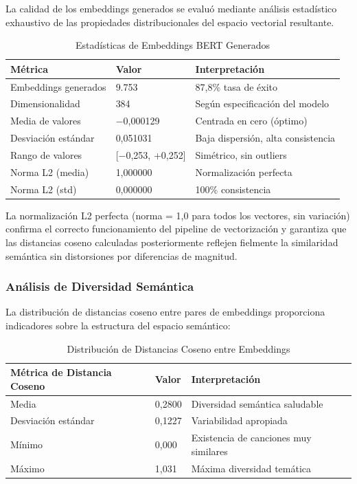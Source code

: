 La calidad de los embeddings generados se evaluó mediante análisis estadístico exhaustivo de las propiedades distribucionales del espacio vectorial resultante.

\begin{table}[htbp]
\centering
\caption{Estadísticas de Embeddings BERT Generados}
\label{tab:estadisticas-embeddings}
\begin{tabular}{lll}
\toprule
\textbf{Métrica} & \textbf{Valor} & \textbf{Interpretación} \\
\midrule
Embeddings generados & 9.753 & 87,8\% tasa de éxito \\
Dimensionalidad & 384 & Según especificación del modelo \\
Media de valores & $-$0,000129 & Centrada en cero (óptimo) \\
Desviación estándar & 0,051031 & Baja dispersión, alta consistencia \\
Rango de valores & [$-$0,253, +0,252] & Simétrico, sin outliers \\
Norma L2 (media) & 1,000000 & Normalización perfecta \\
Norma L2 (std) & 0,000000 & 100\% consistencia \\
\bottomrule
\end{tabular}
\end{table}

La normalización L2 perfecta (norma = 1,0 para todos los vectores, sin variación) confirma el correcto funcionamiento del pipeline de vectorización y garantiza que las distancias coseno calculadas posteriormente reflejen fielmente la similaridad semántica sin distorsiones por diferencias de magnitud.

\subsubsection{Análisis de Diversidad Semántica}

La distribución de distancias coseno entre pares de embeddings proporciona indicadores sobre la estructura del espacio semántico:

\begin{table}[htbp]
\centering
\caption{Distribución de Distancias Coseno entre Embeddings}
\label{tab:distancias-coseno}
\begin{tabular}{lll}
\toprule
\textbf{Métrica de Distancia Coseno} & \textbf{Valor} & \textbf{Interpretación} \\
\midrule
Media & 0,2800 & Diversidad semántica saludable \\
Desviación estándar & 0,1227 & Variabilidad apropiada \\
Mínimo & 0,000 & Existencia de canciones muy similares \\
Máximo & 1,031 & Máxima diversidad temática \\
\bottomrule
\end{tabular}
\end{table}

